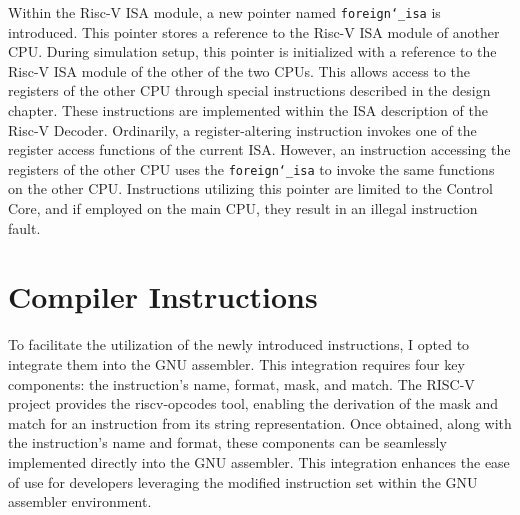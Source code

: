 Within the Risc-V ISA module, a new pointer named \texttt{foreign\char`_isa} is introduced.
This pointer stores a reference to the Risc-V ISA module of another CPU. During
simulation setup, this pointer is initialized with a reference to the Risc-V ISA
module of the other of the two CPUs. This allows access to the registers of the other CPU
through special instructions described in the design chapter. These instructions are
implemented within the ISA description of the Risc-V Decoder. Ordinarily, a
register-altering instruction invokes one of the register access functions of
the current ISA. However, an instruction accessing the registers of the other
CPU uses the \texttt{foreign\char`_isa} to invoke the same functions on the other
CPU. Instructions utilizing this pointer are limited to the Control Core, and if
employed on the main CPU, they result in an illegal instruction fault.

\section{Compiler Instructions}
To facilitate the utilization of the newly introduced instructions, I opted to
integrate them into the GNU assembler. This integration requires four key
components: the instruction's name, format, mask, and match. The RISC-V project
provides the riscv-opcodes tool, enabling the derivation of the mask and match
for an instruction from its string representation. Once obtained, along with the
instruction's name and format, these components can be seamlessly implemented
directly into the GNU assembler. This integration enhances the ease of use for
developers leveraging the modified instruction set within the GNU assembler
environment.